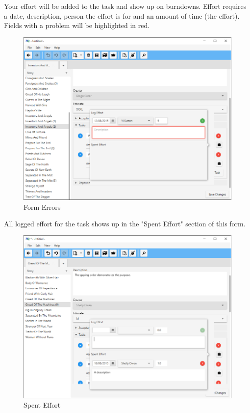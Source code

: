 Your effort will be added to the task and show up on burndowns. Effort requires a date, description, person the effort is for and an amount of time (the effort). Fields with a problem will be highlighted in red.

\begin{figure}[H]
\centering
\includegraphics[width=\textwidth]{images/screenshots/logging2.png}
\caption{Form Errors}
\label{fig:new_project}
\end{figure}

All logged effort for the task shows up in the "Spent Effort" section of this form. 

\begin{figure}[H]
\centering
\includegraphics[width=\textwidth]{images/screenshots/logging4.png}
\caption{Spent Effort}
\label{fig:new_project}
\end{figure}

